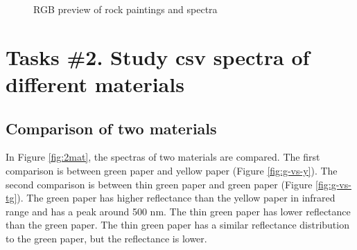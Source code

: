 \begin{figure}[H]
  \centering
  \hspace{0.1cm}
  \vspace{0.1cm}
  \caption[]{RGB preview of rock paintings and spectra }
  \label{fig:rock-painting}
\end{figure}

\section{Tasks \#2. Study csv spectra of different materials}

\subsection{Comparison of two materials}

In Figure \ref{fig:2mat}, the spectras of two materials are compared.
The first comparison is between green paper and yellow paper (Figure
\ref{fig:g-vs-y}). The second comparison is between thin green paper
and green paper (Figure \ref{fig:g-vs-tg}). The green paper has
higher reflectance than the yellow paper in infrared range and has a
peak around 500 nm. The thin green paper has lower reflectance than
the green paper. The thin green paper has a similar reflectance
distribution to the green paper, but the reflectance is lower.

